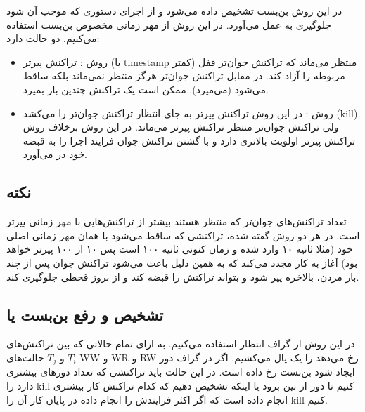 در این روش بن‌بست تشخیص داده می‌شود و از اجرای دستوری که موجب آن شود جلوگیری به
عمل می‌آورد. در این روش از مهر زمانی مخصوص بن‌بست استفاده می‌کنیم. دو حالت دارد:

\begin{itemize}
    \item روش : تراکنش پیرتر (با timestamp کمتر) منتظر می‌ماند که
    تراکنش جوان‌تر قفل مربوطه را آزاد کند. در مقابل تراکنش جوان‌تر هرگز منتظر
    نمی‌ماند بلکه ساقط می‌شود (می‌میرد). ممکن است یک تراکنش چندین بار بمیرد.
    
    \item روش : در این روش تراکنش پیرتر به جای انتظار تراکنش
    جوان‌تر را می‌کشد (kill) ولی تراکنش جوان‌تر منتظر تراکنش پیرتر می‌ماند. در
    این روش برخلاف روش  تراکنش پیرتر اولویت بالاتری دارد و با گشتن
    تراکنش جوان فرایند اجرا را به قبضه خود در می‌آورد.
\end{itemize}

\subsection*{نکته}

تعداد تراکنش‌های جوان‌تر که منتظر هستند بیشتر از تراکنش‌هایی با مهر زمانی پیرتر
است. در هر دو روش گفته شده، تراکنشی که ساقط می‌شود با همان مهر زمانی اصلی خود
(مثلا ثانیه ۱۰ وارد شده و زمان کنونی ثانیه ۱۰۰ است پس ۱۰ از ۱۰۰ پیرتر خواهد بود)
آغاز به کار مجدد می‌کند که به همین دلیل باعث می‌شود تراکنش جوان پس از چند بار
مردن، بالاخره پیر شود و بتواند تراکنش را قبضه کند و از بروز قحطی جلوگیری کند.

\subsection{تشخیص و رفع بن‌بست یا }

در این روش از گراف انتظار استفاده می‌کنیم. به ازای تمام حالاتی‌ که بین
تراکنش‌های $T_i$ و $T_j$ حالت‌های WW و WR و RW رخ می‌دهد را یک یال می‌کشیم. اگر
در گراف دور ایجاد شود بن‌بست رخ داده است. در این حالت باید تراکنشی که تعداد
دور‌های بیشتری دارد را kill کنیم تا دور از بین برود یا اینکه تشخیص دهیم که کدام
تراکنش کار بیشتری انجام داده است که اگر اکثر فرایندش را انجام داده در پایان کار
آن را kill کنیم.

\newpage